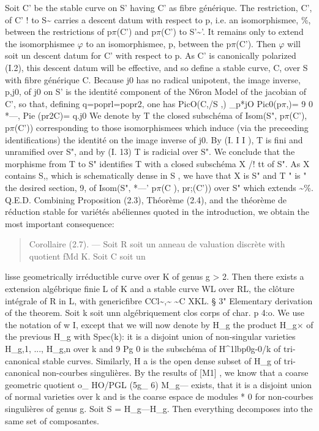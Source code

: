 \documentclass[11pt]{article}
\theoremstyle{plain}
\theoremstyle{definition}
\theoremstyle{remark}
\begin{document}
Soit C' be the stable curve on S' having C' as fibre g\'en\'erique. The restriction, C', of C' ! to S\textasciitilde{} carries a descent datum with respect to p, i.e. an isomorphismee, \%, between the restrictions of p$\pi$(C') and p$\pi$(C') to S'\textasciitilde{}'. It remains only to extend the isomorphismee $\varphi$ to an isomorphismee, p, between the p$\pi$(C'). Then $\varphi$ will soit un descent datum for C' with respect to p. As C' is canonically polarized (I.2), this descent datum will be effective, and so define a stable curve, C, over S with fibre g\'en\'erique C. Because j0 has no radical unipotent, the image inverse, p,j0, of j0 on S' is the identit\'e component of the N6ron Model of the jacobian of C', so that, defining q=poprl=popr2, one has PicO(C,/S ,) \_p*jO Pic0(p$\pi$,)= 9 0 *---, Pie (pr2C)= q.j0 We denote by T the closed subsch\'ema of Isom(S", p$\pi$(C'), p$\pi$(C')) corresponding to those isomorphismees which induce (via the preceeding identifications) the identit\'e on the image inverse of j0. By (I. I I ), T is fini and unramified over S", and by (I. 13) T is radicial over S". We conclude that the morphisme from T to S" identifies T with a closed subsch\'ema X /! tt of S". As X contains S,, which is schematically dense in S , we have that X is S" and T " is " the desired section, 9, of Isom(S", *---' p$\pi$(C ), pr;(C')) over S" which extends \textasciitilde{}\%. Q.E.D. Combining Proposition (2.3), Th\'eor\`eme (2.4), and the th\'eor\`eme de r\'eduction stable for vari\'et\'es ab\'eliennes quoted in the introduction, we obtain the most important consequence:

\begin{quote}Corollaire (2.7). --- Soit R soit un anneau de valuation discr\`ete with quotient fMd K. Soit C soit un\end{quote}
lisse geometrically irr\'eductible curve over K of genus g > 2. Then there exists a extension alg\'ebrique finie L of K and a stable curve WL over RL, the cl\^oture int\'egrale of R in L, with genericfibre CCl\textasciitilde{},\textasciitilde{} \textasciitilde{}C XKL. § 3" Elementary derivation of the theorem. Soit k soit unn alg\'ebriquement clos corps of char. p 4:o. We use the notation of w I, except that we will now denote by H\_g the product H\_g$\times$ of the previous H\_g with Spec(k): it is a disjoint union of non-singular varieties H\_g,1, ..., H\_g,n over k and 9 Pg 0 is the subsch\'ema of H\textasciicircum{}1lbp0g-0/k of tri-canonical stable curves. Similarly, H a is the open dense subset of H\_g of tri-canonical non-courbes singuli\`eres. By the results of [M1] , we know that a coarse geometric quotient o\_ HO/PGL (5g\_ 6) M\_g--- exists, that it is a disjoint union of normal varieties over k and is the coarse espace de modules * 0 for non-courbes singuli\`eres of genus g. Soit S = H\_g---H\_g. Then everything decomposes into the same set of composantes.
\end{document}
